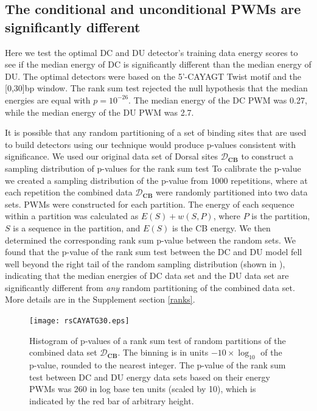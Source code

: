 \subsection{The conditional and unconditional PWMs are significantly different}
 
Here we test the optimal DC and DU detector's training data energy scores to see if the median energy of DC is significantly different than the median energy of DU.  The optimal detectors were based on the 5'-CAYAGT Twist motif and the [0,30]bp window.  The rank sum test rejected the null hypothesis that the median energies are equal with  $p=10^{-26}$.  The median energy of the DC PWM was 0.27, while the median energy of the DU PWM was 2.7.

It is possible that any random partitioning of a set of binding sites that are used to build detectors using our technique would produce p-values consistent with significance.  We used our original data set of Dorsal sites $\mathcal D_{\textbf{CB}}$ to construct a sampling distribution of p-values for the rank sum test 
 To calibrate the p-value we created a sampling distribution of the p-value from 1000 repetitions, where at each repetition the combined data $\mathcal D_{\textbf{CB}}$ were randomly partitioned into two data sets.  PWMs were constructed for each partition.  The energy of each sequence within a partition was calculated as $E(S)+w(S,P)$, where $P$ is the partition, $S$ is a sequence in the partition, and $E(S)$ is the CB energy.  We then determined the corresponding rank sum p-value between the random sets. We found that the p-value of the rank sum test between the DC and DU model fell  well beyond the right tail of the random sampling distribution (shown in ), indicating that the median energies of DC data set and the DU data set are significantly different from {\em any} random partitioning of the combined data set. More details are in the Supplement section \ref{ranks}. %
\begin{figure}
  \texttt{[image: rsCAYATG30.eps]}\\
  \caption {Histogram of p-values of a rank sum test of random partitions of the combined data set $\mathcal D_{\textbf{CB}}$.  The binning is in units  $-10\times \log_{10} $ of the p-value, rounded to the nearest integer. The p-value of the rank sum test between DC and DU energy data sets based on their energy PWMs was 260 in log base ten units (scaled by 10), which is indicated by the red bar of arbitrary height.   
   }\label{b}
\end{figure}


